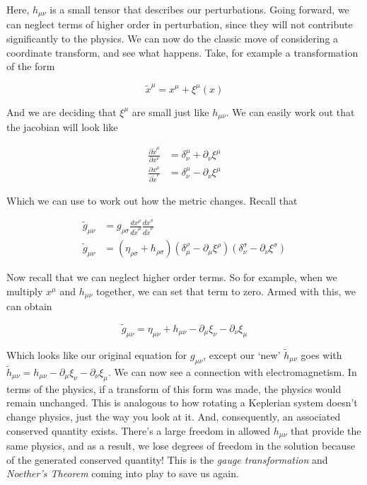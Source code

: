 \documentclass{article}
\newcommand{\mn}{_{\mu\nu}}
\begin{document}
Here, $h\mn$ is a small tensor that describes our perturbations. Going forward, we can neglect terms of higher order in perturbation, since they will not contribute significantly to the physics. We can now do the classic move of considering a coordinate transform, and see what happens. Take, for example a transformation of the form

\begin{equation}
    \tilde{x}^\mu = x^\mu + \xi^\mu(x)
\end{equation}

And we are deciding that $\xi^\mu$ are small just like $h\mn$. We can easily work out that the jacobian will look like

\begin{align}
    \frac{\partial\tilde{x}^\mu}{\partial x^\nu} &= \delta_\nu^\mu + \partial_\nu\xi^\mu \\
    \frac{\partial x^\mu}{\partial\tilde{x}^\nu} &= \delta_\nu^\mu - \partial_\nu\xi^\mu
\end{align}

Which we can use to work out how the metric changes. Recall that

\begin{align}
    \tilde{g}\mn &= g_{\rho\sigma} \frac{dx^\rho}{d\tilde{x}^\mu} \frac{dx^\sigma}{d\tilde{x}^\nu} \\
    \tilde{g}\mn &= (\eta_{\rho\sigma} + h_{\rho\sigma})(\delta_\mu^\rho - \partial_\mu\xi^\rho)(\delta_\nu^\sigma - \partial_\nu\xi^\sigma)
\end{align}

Now recall that we can neglect higher order terms. So for example, when we multiply $x^\mu$ and $h\mn$ together, we can set that term to zero. Armed with this, we can obtain

\begin{equation}
    \tilde{g}\mn = \eta\mn + h\mn - \partial_\mu\xi_\nu - \partial_\nu\xi_\mu
\end{equation}

Which looks like our original equation for $g\mn$, except our `new' $\tilde{h}\mn$ goes with $\tilde{h}\mn=h\mn-\partial_\mu\xi_\nu-\partial_\nu\xi_\mu$. We can now see a connection with electromagnetism. In terms of the physics, if a transform of this form was made, the physics would remain unchanged. This is analogous to how rotating a Keplerian system doesn't change physics, just the way you look at it. And, consequently, an associated conserved quantity exists. There's a large freedom in allowed $h\mn$ that provide the same physics, and as a result, we lose degrees of freedom in the solution because of the generated conserved quantity! This is the \textit{gauge transformation} and \textit{Noether's Theorem} coming into play to save us again.
\end{document}
